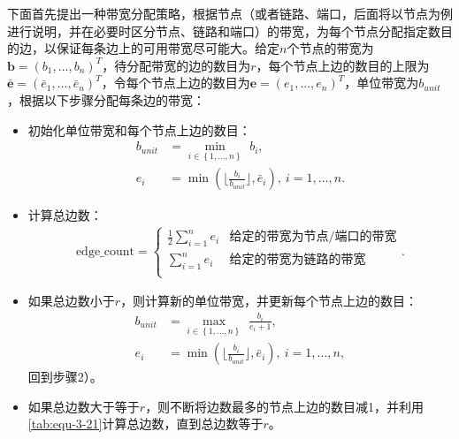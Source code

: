 下面首先提出一种带宽分配策略，根据节点（或者链路、端口，后面将以节点为例进行说明，并在必要时区分节点、链路和端口）的带宽，为每个节点分配指定数目的边，以保证每条边上的可用带宽尽可能大。给定$n$个节点的带宽为$\boldsymbol{b}=\left( b_1,...,b_n \right)^T$，待分配带宽的边的数目为$r$，每个节点上边的数目的上限为$\bar{\boldsymbol{e}}=\left( \bar{e}_1,...,\bar{e}_n \right)^T$，令每个节点上边的数目为$\boldsymbol{e}=\left( e_1,...,e_n \right)^T$，单位带宽为$b_{unit}$，根据以下步骤分配每条边的带宽：
\begin{itemize}
    \item[1）] 初始化单位带宽和每个节点上边的数目：
    \begin{equation}
        \begin{aligned}
        \label{tab:equ-3-20}
        b_{unit}&=\underset{i\in \left\{ 1,...,n \right\}}{\min}\,\,b_i,
        \\
        e_i&=\min \left( \lfloor \frac{b_i}{b_{unit}} \rfloor ,\bar{e}_i \right) ,\ i=1,...,n.
        \end{aligned}
    \end{equation}
    \item[2）] 计算总边数：
    \begin{equation}
        \begin{aligned}
        \label{tab:equ-3-21}
        \mathrm{edge}\_\mathrm{count}=\left\{ \begin{matrix}
            \frac{1}{2}\sum_{i=1}^n{e_i}&		\text{给定的带宽为节点}/\text{端口的带宽}\\
            \sum_{i=1}^n{e_i}&		\text{给定的带宽为链路的带宽}\\
        \end{matrix}. \right.
        \end{aligned}
    \end{equation}
    \item[3）] 如果总边数小于$r$，则计算新的单位带宽，并更新每个节点上边的数目：
    \begin{equation}
        \begin{aligned}
        \label{tab:equ-3-22}
        b_{unit}&=\underset{i\in \left\{ 1,...,n \right\}}{\max}\,\,\frac{b_i}{e_i+1},\\
        e_i&=\min \left( \lfloor \frac{b_i}{b_{unit}} \rfloor ,\bar{e}_i \right) ,\ i=1,...,n,
        \end{aligned}
    \end{equation}
    回到步骤2）。
    \item[4）] 如果总边数大于等于$r$，则不断将边数最多的节点上边的数目减1，并利用\autoref{tab:equ-3-21}计算总边数，直到总边数等于$r$。
    
\end{itemize}

